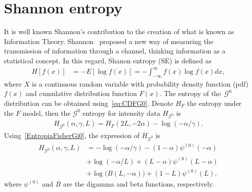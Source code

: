 \documentclass[journal]{IEEEtran}
\begin{document}
\section{Shannon entropy}

It is well known Shannon's contribution to the creation of what is known as Information Theory. 
Shannon~\cite{Shannon1948} proposed a new way of
measuring the transmission of information through a channel, thinking information as a statistical concept. 
In this regard, Shanon entropy (SE) is defined as
\begin{align}
	\label{SE}
	H[f(x)]&=-E[\log f(x)]=-\int_{-\infty}^{\infty} f(x) \log f(x) d x,
\end{align}
where $X$ is a continuous random variable with probability density function (pdf) $f(x)$ and
cumulative distribution function $F(x)$. 
The entropy of the~$\mathcal{G}^0$ distribution can be obtained using~\eqref{eq:CDFG0}.
Denote $H_{F}$ the entropy under the $F$ model, then the $\mathcal{G}^0$ entropy for intensity data $H_{\mathcal G^0}$ is 
\begin{align}
	\label{EntropiaFisherGi0}
	H_{\mathcal G^0}(\alpha,\gamma,L)=H_{F}(2 L, - 2 \alpha) -\log(-\alpha / \gamma).
\end{align}
Using~\eqref{EntropiaFisherGi0}, the
expression of $H_{\mathcal G^0}$ is
\begin{align}
	\label{EG0}
	H_{\mathcal G^0}(\alpha,\gamma,L)&=-\log (-\alpha / \gamma)-(1-\alpha ) \psi^{(0)}(-\alpha )\\ \nonumber
	&+\log (-\alpha / L)+ ( L- \alpha ) \psi ^{(0)} ( L- \alpha )\\ \nonumber
	&+\log \big(B(L,-\alpha )\big)+(1-L) \psi^{(0)}(L),
\end{align}
where $\psi^{(0)}$ and $B$ are the digamma and beta functions, respectively.


\end{document}
